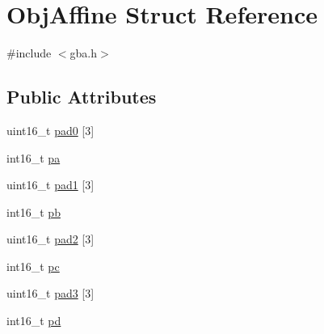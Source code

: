 \hypertarget{struct_obj_affine}{\section{Obj\-Affine Struct Reference}
\label{struct_obj_affine}
}


{\ttfamily \#include $<$gba.\-h$>$}

\subsection*{Public Attributes}
\begin{DoxyCompactItemize}
\item 
uint16\-\_\-t \hyperlink{struct_obj_affine_a5fdab3616d01dfd6d8440bc61f02a0e4}{pad0} \mbox{[}3\mbox{]}
\item 
int16\-\_\-t \hyperlink{struct_obj_affine_ae972edc100334aa968f79bb844763564}{pa}
\item 
uint16\-\_\-t \hyperlink{struct_obj_affine_a88ec2e52a1bdabd87a59c8246e30a2ec}{pad1} \mbox{[}3\mbox{]}
\item 
int16\-\_\-t \hyperlink{struct_obj_affine_a1f9024df291f5a7c32ce2444c8446144}{pb}
\item 
uint16\-\_\-t \hyperlink{struct_obj_affine_af6e35040fbfc316b1fa138e11752fa46}{pad2} \mbox{[}3\mbox{]}
\item 
int16\-\_\-t \hyperlink{struct_obj_affine_a2fd9f343a9c4a1dd3911f94db706e7ff}{pc}
\item 
uint16\-\_\-t \hyperlink{struct_obj_affine_af0a9dcf2ed70d86454ed49f44a894021}{pad3} \mbox{[}3\mbox{]}
\item 
int16\-\_\-t \hyperlink{struct_obj_affine_a1ae4cd5cf780b89479e4fe39d2377798}{pd}
\end{DoxyCompactItemize}


